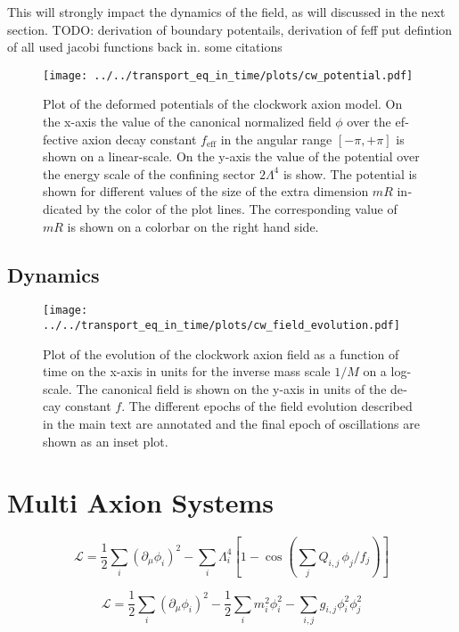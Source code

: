 \documentclass[master,       %
               twoside,        %
               BCOR10mm,       %
               english,ngerman, %
               ]{GAUBM}
\begin{document}
\begin{otherlanguage}{english}
This will strongly impact the dynamics of the field, as will discussed in the next section.
TODO: derivation of boundary potentails, derivation of feff
put defintion of all used jacobi functions back in.
some citations 
\begin{figure}[H]
	\label{fig:clockwork_pot_plot}
    \texttt{[image: ../../transport\_eq\_in\_time/plots/cw\_potential.pdf]}
    \caption{Plot of the deformed potentials of the clockwork axion model. On the x-axis the value of the canonical normalized field $\phi$ over the effective axion decay constant $f_\mathrm{eff}$ in the angular range $[-\pi, +\pi]$ is shown on a linear-scale. On the y-axis the value of the potential over the energy scale of the confining sector $2 \Lambda^4$ is show. The potential is shown for different values of the size of the extra dimension $mR$ indicated by the color of the plot lines. The corresponding value of $mR$ is shown on a colorbar on the right hand side.}
\end{figure}

\subsection{Dynamics}
\begin{figure}[H]
    \texttt{[image: ../../transport\_eq\_in\_time/plots/cw\_field\_evolution.pdf]}
    \caption{Plot of the evolution of the clockwork axion field as a function of time on the x-axis in units for the inverse mass scale $1/M$ on a log-scale. The canonical field is shown on the y-axis in units of the decay constant $f$. The different epochs of the field evolution described in the main text are annotated and the final epoch of oscillations are shown as an inset plot.}
\end{figure}


\section{Multi Axion Systems}

\begin{equation}
	\mathcal{L} = \frac{1}{2} \sum_i \left( \partial_\mu \phi_i \right)^2 - \sum_i \Lambda_i^4 \left[ 1 - \cos \left( \sum_j Q_{i,j} \, \phi_j / f_j \right) \right]
\end{equation}

\begin{equation}
	\mathcal{L} = \frac{1}{2} \sum_i \left( \partial_\mu \phi_i \right)^2 - \frac{1}{2} \sum_i m_i^2 \phi_i^2 - \sum_{i, j}
	g_{i, j} \phi_i^2 \phi_j^2
\end{equation}


\end{otherlanguage}
\end{document}
